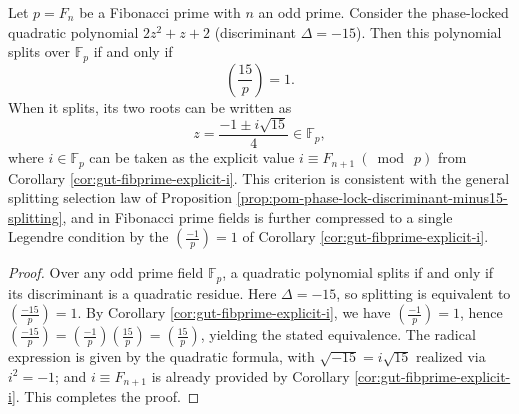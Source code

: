 \begin{corollary}\label{cor:gut-fibprime-disc-minus15-criterion}
Let \(p=F_n\) be a Fibonacci prime with \(n\) an odd prime.
Consider the phase-locked quadratic polynomial \(2z^2+z+2\) (discriminant \(\Delta=-15\)).
Then this polynomial splits over \(\mathbb{F}_p\) if and only if
\[
\left(\frac{15}{p}\right)=1.
\]
When it splits, its two roots can be written as
\[
z=\frac{-1\pm i\sqrt{15}}{4}\in\mathbb{F}_p,
\]
where \(i\in\mathbb{F}_p\) can be taken as the explicit value \(i\equiv F_{n+1}\ (\bmod\ p)\) from Corollary \ref{cor:gut-fibprime-explicit-i}.
This criterion is consistent with the general splitting selection law of Proposition \ref{prop:pom-phase-lock-discriminant-minus15-splitting}, and in Fibonacci prime fields is further compressed to a single Legendre condition by the \(\left(\frac{-1}{p}\right)=1\) of Corollary \ref{cor:gut-fibprime-explicit-i}.
\end{corollary}
\begin{proof}
Over any odd prime field \(\mathbb{F}_p\), a quadratic polynomial splits if and only if its discriminant is a quadratic residue.
Here \(\Delta=-15\), so splitting is equivalent to \(\left(\frac{-15}{p}\right)=1\).
By Corollary \ref{cor:gut-fibprime-explicit-i}, we have \(\left(\frac{-1}{p}\right)=1\), hence
\(
\left(\frac{-15}{p}\right)=\left(\frac{-1}{p}\right)\left(\frac{15}{p}\right)=\left(\frac{15}{p}\right)
\), yielding the stated equivalence.
The radical expression is given by the quadratic formula, with \(\sqrt{-15}=i\sqrt{15}\) realized via \(i^2=-1\); and \(i\equiv F_{n+1}\) is already provided by Corollary \ref{cor:gut-fibprime-explicit-i}. This completes the proof.
\end{proof}

\endinput
